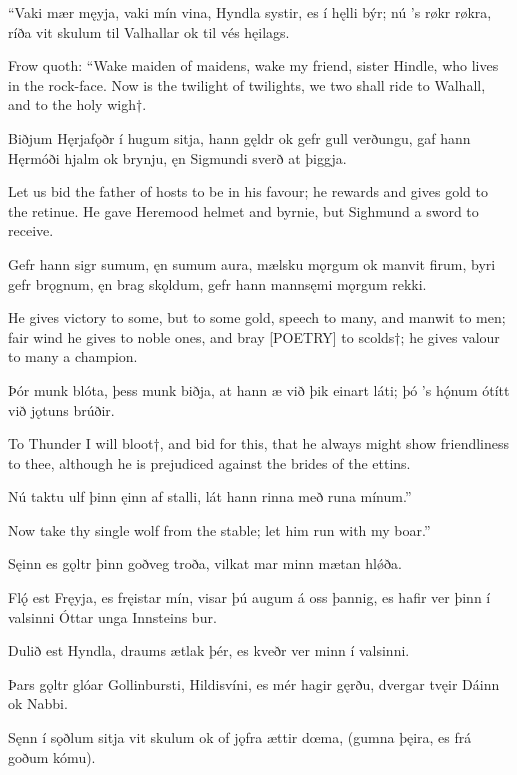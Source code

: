 “Vaki mær męyja, \hld vaki mín vina,
Hyndla systir, \hld es í hęlli býr;
nú ’s røkr røkra, \hld ríða vit skulum
til Valhallar \hld ok til vés hęilags.

Frow quoth:
“Wake maiden of maidens, wake my friend, sister Hindle, who lives in the rock-face. Now is the twilight of twilights, we two shall ride to Walhall, and to the holy wigh†.

Biðjum Hęrjafǫðr \hld í hugum sitja,
hann gęldr ok gefr \hld gull verðungu,
gaf hann Hęrmóði \hld hjalm ok brynju,
ęn Sigmundi \hld sverð at þiggja.

Let us bid the father of hosts to be in his favour; he rewards and gives gold to the retinue. He gave Heremood helmet and byrnie, but Sighmund a sword to receive.

Gefr hann sigr sumum, \hld ęn sumum aura,
mælsku mǫrgum \hld ok manvit firum,
byri gefr brǫgnum, \hld ęn brag skǫldum,
gefr hann mannsęmi \hld mǫrgum rekki.

He gives victory to some, but to some gold, speech to many, and manwit to men; fair wind he gives to noble ones, and bray [POETRY] to scolds†; he gives valour to many a champion.

Þór munk blóta, \hld þess munk biðja,
at hann æ við þik \hld einart láti;
þó ’s hǫ́num ótítt \hld við jǫtuns brúðir.

To Thunder I will bloot†, and bid for this, that he always might show friendliness to thee, although he is prejudiced against the brides of the ettins\footnotemark[1].

Nú taktu ulf þinn \hld ęinn af stalli,
lát hann rinna \hld með runa mínum.”

Now take thy single wolf from the stable; let him run with my boar.”

Sęinn es gǫltr þinn \hld goðveg troða,
vilkat mar minn \hld mætan hlǿða.

Flǫ́ est Fręyja, \hld es fręistar mín,
visar þú augum \hld á oss þannig,
es hafir ver þinn \hld í valsinni
Óttar unga \hld Innsteins bur.

Dulið est Hyndla, \hld draums ætlak þér,
es kveðr ver minn \hld í valsinni.

Þars gǫltr glóar \hld Gollinbursti,
Hildisvíni, \hld es mér hagir gęrðu,
dvergar tvęir \hld Dáinn ok Nabbi.

Sęnn í sǫðlum \hld sitja vit skulum
ok of jǫfra \hld ættir dœma,
(gumna þęira, \hld es frá goðum kómu).


